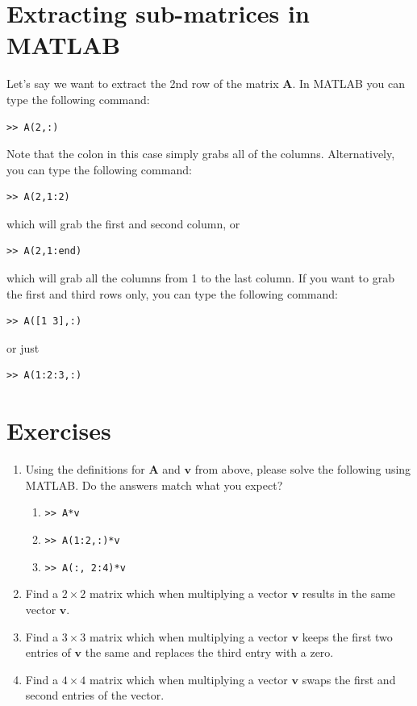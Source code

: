 \documentclass{tufte-handout}
\begin{document}
\section{Extracting sub-matrices in MATLAB}
Let's say we want to extract the 2nd row of the matrix $\mathbf{A}$. In MATLAB you can type the following command:
\begin{verbatim}
>> A(2,:)
\end{verbatim}
Note that the colon in this case simply grabs all of the columns. Alternatively, you can type the following command:
\begin{verbatim}
>> A(2,1:2)
\end{verbatim}
which will grab the first and second column, or
\begin{verbatim}
>> A(2,1:end)
\end{verbatim}
which will grab all the columns from 1 to the last column. If you want to grab the first and third rows only, you can type the following command:
\begin{verbatim}
>> A([1 3],:)
\end{verbatim}
or just
\begin{verbatim}
>> A(1:2:3,:)
\end{verbatim}

\section{Exercises}
\begin{enumerate}[resume]
\item Using the definitions for $\mathbf{A}$ and $\mathbf{v}$ from above, please solve the following using MATLAB. Do the answers match what you expect?
\begin{enumerate}
\item {\tt  >>  A*v}
\item {\tt  >>  A(1:2,:)*v}
\item {\tt  >> A(:, 2:4)*v}
\end{enumerate}
\item Find a $2 \times 2$ matrix which when multiplying a vector $\mathbf{v}$ results in the same vector $\mathbf{v}$.
\item Find a $3 \times 3$ matrix which when multiplying a vector $\mathbf{v}$ keeps the first two entries of $\mathbf{v}$ the same and replaces the third entry with a zero.
\item Find a $4 \times 4$ matrix which when multiplying a vector $\mathbf{v}$ swaps the first and second entries of the vector.
\end{enumerate}
\end{document}
